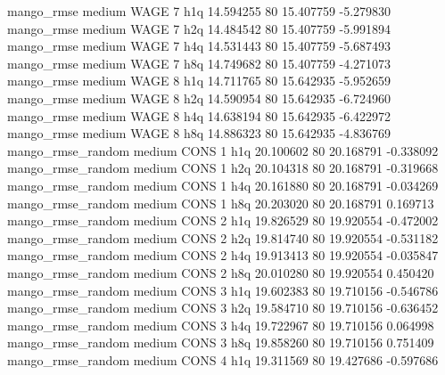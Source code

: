        mango_rmse     medium     WAGE                 7                  h1q 14.594255 80      15.407759          -5.279830
       mango_rmse     medium     WAGE                 7                  h2q 14.484542 80      15.407759          -5.991894
       mango_rmse     medium     WAGE                 7                  h4q 14.531443 80      15.407759          -5.687493
       mango_rmse     medium     WAGE                 7                  h8q 14.749682 80      15.407759          -4.271073
       mango_rmse     medium     WAGE                 8                  h1q 14.711765 80      15.642935          -5.952659
       mango_rmse     medium     WAGE                 8                  h2q 14.590954 80      15.642935          -6.724960
       mango_rmse     medium     WAGE                 8                  h4q 14.638194 80      15.642935          -6.422972
       mango_rmse     medium     WAGE                 8                  h8q 14.886323 80      15.642935          -4.836769
mango_rmse_random     medium     CONS                 1                  h1q 20.100602 80      20.168791          -0.338092
mango_rmse_random     medium     CONS                 1                  h2q 20.104318 80      20.168791          -0.319668
mango_rmse_random     medium     CONS                 1                  h4q 20.161880 80      20.168791          -0.034269
mango_rmse_random     medium     CONS                 1                  h8q 20.203020 80      20.168791           0.169713
mango_rmse_random     medium     CONS                 2                  h1q 19.826529 80      19.920554          -0.472002
mango_rmse_random     medium     CONS                 2                  h2q 19.814740 80      19.920554          -0.531182
mango_rmse_random     medium     CONS                 2                  h4q 19.913413 80      19.920554          -0.035847
mango_rmse_random     medium     CONS                 2                  h8q 20.010280 80      19.920554           0.450420
mango_rmse_random     medium     CONS                 3                  h1q 19.602383 80      19.710156          -0.546786
mango_rmse_random     medium     CONS                 3                  h2q 19.584710 80      19.710156          -0.636452
mango_rmse_random     medium     CONS                 3                  h4q 19.722967 80      19.710156           0.064998
mango_rmse_random     medium     CONS                 3                  h8q 19.858260 80      19.710156           0.751409
mango_rmse_random     medium     CONS                 4                  h1q 19.311569 80      19.427686          -0.597686
